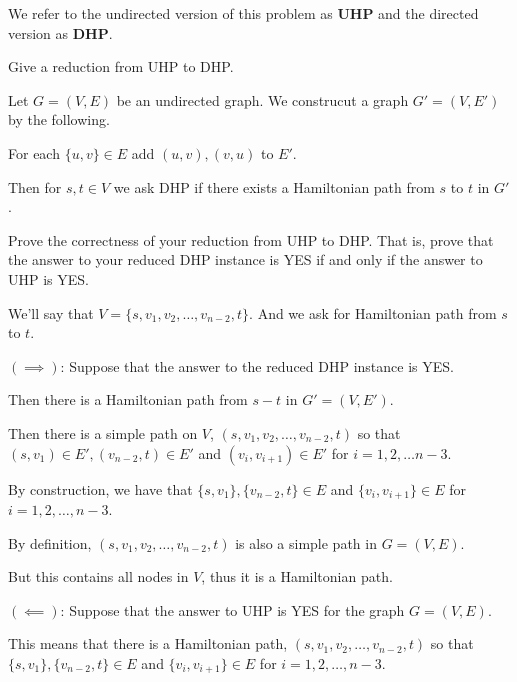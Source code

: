 We refer to the undirected version of this problem as \textbf{UHP} and the directed version as \textbf{DHP}.

\begin{questions}

	\question[3] Give a reduction from UHP to DHP.

	\ifsolutions\fi

	\begin{soln}

		Let \(G = (V, E)\) be an undirected graph. We construcut a graph \(G' = (V, E')\) by the following.

		For each \(\{u, v\} \in E\) add \((u, v), (v, u)\) to \(E'\).

		Then for \(s, t \in V\) we ask DHP if there exists a Hamiltonian path from \(s\) to \(t\) in \(G'\).

	\end{soln}


	\question[4] Prove the correctness of your reduction from UHP to DHP. That is, prove that the answer to your reduced DHP instance is YES if and only if the answer to UHP is YES.

	\ifsolutions\fi
	\begin{soln}

		We'll say that \(V = \{s, v_1, v_2, \dots, v_{n-2}, t\}\). And we ask for Hamiltonian path from \(s\) to \(t\).

		\((\implies)\): Suppose that the answer to the reduced DHP instance is YES.

		Then there is a Hamiltonian path from \(s-t\) in \(G' = (V, E')\).

		Then there is a simple path on \(V\), \((s, v_1, v_2, \dots, v_{n-2}, t)\) so that \((s, v_1) \in E', (v_{n-2}, t) \in E'\) and \((v_{i},v_{i+1}) \in E'\) for \(i = 1, 2, \dots n - 3\).

		By construction, we have that \(\{s, v_1\}, \{v_{n-2}, t\} \in E\) and \(\{v_i, v_{i+1}\} \in E\) for \(i = 1, 2, \dots, n - 3\).

		By definition, \((s, v_1, v_2, \dots, v_{n- 2}, t)\) is also a simple path in \(G = (V, E)\).

		But this contains all nodes in \(V\), thus it is a Hamiltonian path.

		\((\impliedby)\): Suppose that the answer to UHP is YES for the graph \(G = (V, E)\).

		This means that there is a Hamiltonian path, \((s, v_1, v_2, \dots, v_{n-2}, t)\) so that \(\{s, v_1\}, \{v_{n-2}, t\} \in E\) and \(\{v_i, v_{i+1}\} \in E\) for \(i = 1, 2, \dots, n - 3\).


\end{soln}
\end{questions}
